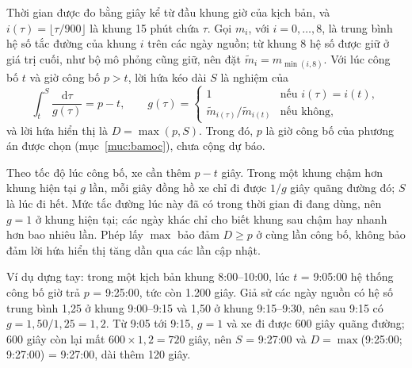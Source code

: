 Thời gian được đo bằng giây kể từ đầu khung giờ của kịch bản, và $i(\tau) = \lfloor \tau / 900 \rfloor$ là
khung 15 phút chứa $\tau$. Gọi $m_i$, với $i = 0, \ldots, 8$, là trung bình hệ số tắc đường của khung $i$ trên
các ngày nguồn; từ khung 8 hệ số được giữ ở giá trị cuối, như bộ mô phỏng cũng giữ, nên đặt
$\tilde m_i = m_{\min(i, 8)}$. Với lúc công bố $t$ và giờ công bố $p > t$, lời hứa kéo dài $S$ là nghiệm của
\begin{equation}
\int_{t}^{S} \frac{\mathrm{d}\tau}{g(\tau)} = p - t, \qquad
g(\tau) =
\begin{cases}
1 & \text{nếu } i(\tau) = i(t),\\
\tilde m_{i(\tau)} / \tilde m_{i(t)} & \text{nếu không,}
\end{cases}
\label{eq:keodan}
\end{equation}
và lời hứa hiển thị là $D = \max(p, S)$. Trong đó, $p$ là giờ công bố của phương án được chọn
(mục~\ref{muc:bamoc}), chưa cộng dự báo.

Theo tốc độ lúc công bố, xe cần thêm $p - t$ giây. Trong một khung chậm hơn khung hiện tại $g$ lần, mỗi giây đồng
hồ xe chỉ đi được $1/g$ giây quãng đường đó; $S$ là lúc đi hết. Mức tắc đường lúc này đã có trong thời gian đi
đang dùng, nên $g = 1$ ở khung hiện tại; các ngày khác chỉ cho biết khung sau chậm hay nhanh hơn bao nhiêu lần.
Phép lấy $\max$ bảo đảm $D \ge p$ ở cùng lần công bố, không bảo đảm lời hứa hiển thị tăng dần qua các lần cập
nhật.

Ví dụ dựng tay: trong một kịch bản khung 8:00--10:00, lúc $t$ = 9:05:00 hệ thống công bố giờ trả $p$ = 9:25:00,
tức còn 1.200 giây. Giả sử các ngày nguồn có hệ số trung bình 1,25 ở khung 9:00--9:15 và 1,50 ở khung
9:15--9:30, nên sau 9:15 có $g = 1{,}50/1{,}25 = 1{,}2$. Từ 9:05 tới 9:15, $g = 1$ và xe đi được 600 giây quãng
đường; 600 giây còn lại mất $600 \times 1{,}2 = 720$ giây, nên $S$ = 9:27:00 và $D = \max$(9:25:00; 9:27:00) =
9:27:00, dài thêm 120 giây.

